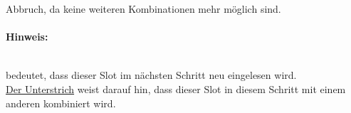 \begin{solution}
Abbruch, da keine weiteren Kombinationen mehr möglich sind.

\paragraph{\color{solutioncolor}Hinweis:} \begin{tabular}{|c|}
		\hline
		\cellcolor{orange}\\
		\hline
	\end{tabular}
bedeutet, dass dieser Slot im nächsten Schritt neu eingelesen wird. \\
	\underline{Der Unterstrich} weist darauf hin, dass dieser Slot in diesem Schritt mit einem anderen kombiniert wird.
\end{solution}
